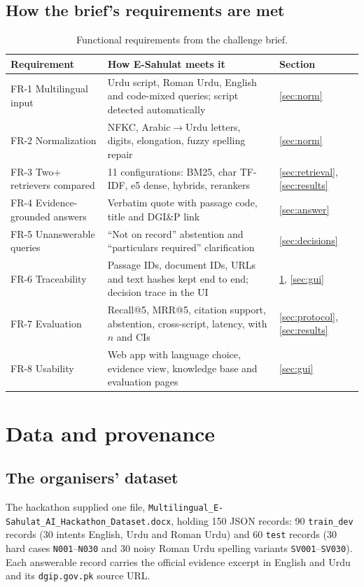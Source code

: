 \documentclass[11pt,a4paper]{article}
\begin{document}
\subsection{How the brief's requirements are met}
\begin{table}[H]
\centering\small
\begin{tabularx}{\textwidth}{@{}l X l@{}}
\toprule
Requirement & How E-Sahulat meets it & Section\\
\midrule
FR-1 Multilingual input & Urdu script, Roman Urdu, English and code-mixed queries; script detected automatically & \ref{sec:norm}\\
FR-2 Normalization & NFKC, Arabic$\to$Urdu letters, digits, elongation, fuzzy spelling repair & \ref{sec:norm}\\
FR-3 Two+ retrievers compared & 11 configurations: BM25, char TF-IDF, e5 dense, hybrids, rerankers & \ref{sec:retrieval}, \ref{sec:results}\\
FR-4 Evidence-grounded answers & Verbatim quote with passage code, title and DGI\&P link & \ref{sec:answer}\\
FR-5 Unanswerable queries & ``Not on record'' abstention and ``particulars required'' clarification & \ref{sec:decisions}\\
FR-6 Traceability & Passage IDs, document IDs, URLs and text hashes kept end to end; decision trace in the UI & \ref{sec:data}, \ref{sec:gui}\\
FR-7 Evaluation & Recall@5, MRR@5, citation support, abstention, cross-script, latency, with $n$ and CIs & \ref{sec:protocol}, \ref{sec:results}\\
FR-8 Usability & Web app with language choice, evidence view, knowledge base and evaluation pages & \ref{sec:gui}\\
\bottomrule
\end{tabularx}
\caption{Functional requirements from the challenge brief.}
\end{table}

\section{Data and provenance}
\label{sec:data}

\subsection{The organisers' dataset}
The hackathon supplied one file, \texttt{Multilingual\_E-Sahulat\_AI\_Hackathon\_Dataset.docx}, holding 150 JSON records:
90 \texttt{train\_dev} records (30 intents \texttimes{} English, Urdu and Roman Urdu) and 60 \texttt{test} records (30 hard
cases \texttt{N001}--\texttt{N030} and 30 noisy Roman Urdu spelling variants \texttt{SV001}--\texttt{SV030}). Each answerable
record carries the official evidence excerpt in English and Urdu and its \texttt{dgip.gov.pk} source URL.
\end{document}
